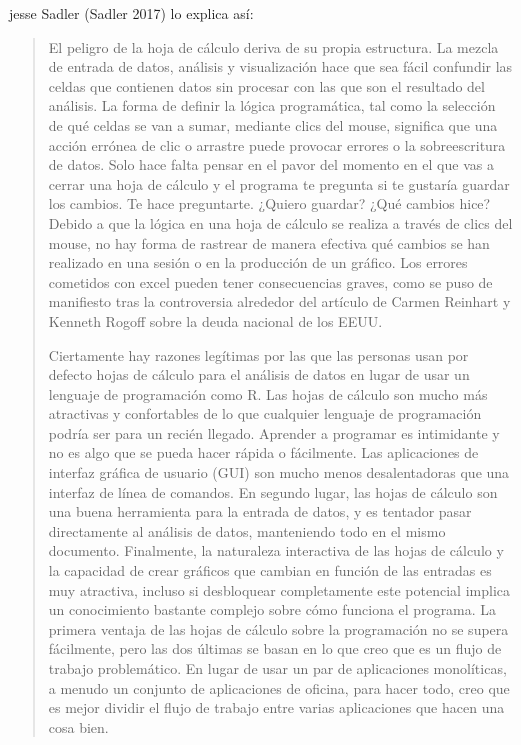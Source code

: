 \documentclass[
  letterpaper,
]{scrbook}
\begin{document}
jesse Sadler (Sadler 2017) lo explica así:

\begin{quote}

El peligro de la hoja de cálculo deriva de su propia estructura. La mezcla de entrada de datos, análisis y visualización hace que sea fácil confundir las celdas que contienen datos sin procesar con las que son el resultado del análisis. La forma de definir la lógica programática, tal como la selección de qué celdas se van a sumar, mediante clics del mouse, significa que una acción errónea de clic o arrastre puede provocar errores o la sobreescritura de datos. Solo hace falta pensar en el pavor del momento en el que vas a cerrar una hoja de cálculo y el programa te pregunta si te gustaría guardar los cambios. Te hace preguntarte. ¿Quiero guardar? ¿Qué cambios hice? Debido a que la lógica en una hoja de cálculo se realiza a través de clics del mouse, no hay forma de rastrear de manera efectiva qué cambios se han realizado en una sesión o en la producción de un gráfico. Los errores cometidos con excel pueden tener consecuencias graves,  como se puso de manifiesto tras la controversia alrededor del artículo de Carmen Reinhart y Kenneth Rogoff sobre la deuda nacional de los EEUU.

Ciertamente hay razones legítimas por las que las personas usan por defecto hojas de cálculo para el análisis de datos en lugar de usar un lenguaje de programación como R. Las hojas de cálculo son mucho más atractivas y confortables de lo que cualquier lenguaje de programación podría ser para un recién llegado. Aprender a programar es intimidante y no es algo que se pueda hacer rápida o fácilmente. Las aplicaciones de interfaz gráfica de usuario (GUI) son mucho menos desalentadoras que una interfaz de línea de comandos. En segundo lugar, las hojas de cálculo son una buena herramienta para la entrada de datos, y es tentador pasar directamente al análisis de datos, manteniendo todo en el mismo documento. Finalmente, la naturaleza interactiva de las hojas de cálculo y la capacidad de crear gráficos que cambian en función de las entradas es muy atractiva, incluso si desbloquear completamente este potencial implica un conocimiento bastante complejo sobre cómo funciona el programa. La primera ventaja de las hojas de cálculo sobre la programación no se supera fácilmente, pero las dos últimas se basan en lo que creo que es un flujo de trabajo problemático. En lugar de usar un par de aplicaciones monolíticas, a menudo un conjunto de aplicaciones de oficina, para hacer todo, creo que es mejor dividir el flujo de trabajo entre varias aplicaciones que hacen una cosa bien.


\end{quote}
\end{document}
